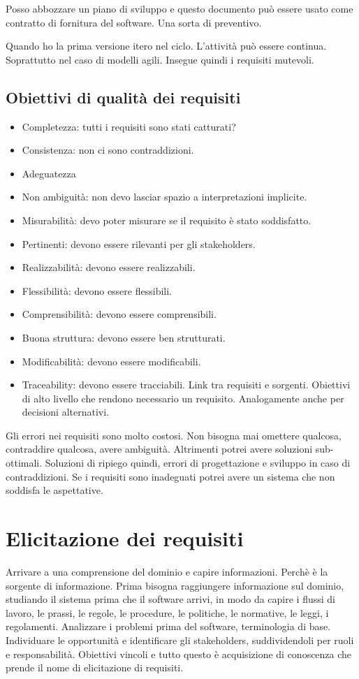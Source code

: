 \documentclass[oneside,a4paper,11pt]{book}
\theoremstyle{italicstyle}
\theoremstyle{normStyle}
\begin{document}
Posso abbozzare un piano di sviluppo e questo documento può essere 
usato come contratto di fornitura del software. Una sorta di preventivo.

Quando ho la prima versione itero nel ciclo. L'attività può essere continua.
Soprattutto nel caso di modelli agili. Insegue quindi i requisiti mutevoli.

\section{Obiettivi di qualità dei requisiti}
\begin{itemize}
  \item Completezza: tutti i requisiti sono stati catturati?
  \item Consistenza: non ci sono contraddizioni.
  \item Adeguatezza
  \item Non ambiguità: non devo lasciar spazio a interpretazioni implicite.
  \item Misurabilità: devo poter misurare se il requisito è stato soddisfatto.
  \item Pertinenti: devono essere rilevanti per gli stakeholders.
  \item Realizzabilità: devono essere realizzabili.
  \item Flessibilità: devono essere flessibili.
  \item Comprensibilità: devono essere comprensibili.
  \item Buona struttura: devono essere ben strutturati.
  \item Modificabilità: devono essere modificabili.
  \item Traceability: devono essere tracciabili. Link tra requisiti
  e sorgenti. Obiettivi di alto livello che rendono necessario
  un requisito. Analogamente anche per decisioni alternativi.
\end{itemize}
Gli errori nei requisiti sono molto costosi. 
Non bisogna mai omettere qualcosa, contraddire qualcosa, avere ambiguità.
Altrimenti potrei avere soluzioni sub-ottimali. Soluzioni di ripiego quindi,
errori di progettazione e sviluppo in caso di contraddizioni. Se i requisiti sono 
inadeguati potrei avere un sistema che non soddisfa le aspettative.
\chapter{Elicitazione dei requisiti}
Arrivare a una comprensione del dominio e capire informazioni. Perchè 
è la sorgente di informazione.
Prima bisogna raggiungere informazione sul dominio, studiando il sistema prima 
che il software arrivi, in modo da capire i flussi di lavoro, le prassi,
le regole, le procedure, le politiche, le normative, le leggi, i regolamenti.
Analizzare i problemi prima del software, terminologia di base.
Individuare le opportunità e identificare gli stakeholders, suddividendoli 
per ruoli e responsabilità. Obiettivi vincoli e tutto questo è acquisizione di 
conoscenza che prende il nome di elicitazione di requisiti.
\end{document}
